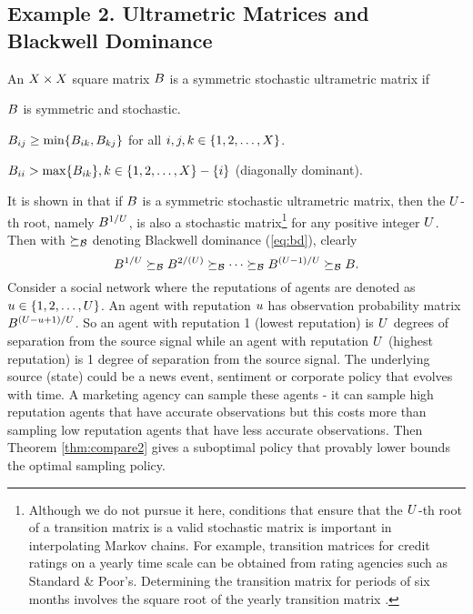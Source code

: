 \documentclass[draftcls,onecolumn]{IEEEtran}
\begin{document}
\subsection{Example 2.  Ultrametric Matrices  and Blackwell Dominance}
An $X\times X$ square matrix $B$ is   a symmetric stochastic ultrametric matrix if 
 
\begin{compactenum}
\item $B$ is symmetric and stochastic. 
\item $B_{ij} \geq \min \{B_{ik}, B_{kj}\}$ for all $i,j,k \in \{1,2,\ldots,X\}$.
\item $B_{ii} > \max \{B_{ik}\}, k \in  \{1,2,\ldots,X\}- \{i\}$  (diagonally dominant).
\end{compactenum}
 It is shown in \cite{HL11}  that if $B$ is a symmetric  stochastic  ultrametric matrix, then the $U$-th root, namely $B^{1/U}$, is also a stochastic matrix\footnote{Although we do not pursue it here, conditions that 
 ensure that  the $U$-th root of a transition matrix is a valid stochastic matrix  is important
 in interpolating Markov chains. For example, transition matrices for credit ratings on a yearly time scale
 can be obtained from rating agencies such as Standard \& Poor's. Determining the transition matrix for periods of six months involves the square root of the yearly transition matrix \cite{HL11}.}
for any positive  integer $U$. Then with $\succeq_{\mathcal{B}}$ denoting Blackwell dominance (\ref{eq:bd}),
clearly  $$B^{1/U} \succeq_{\mathcal{B}} B^{2/(U)} \succeq_{\mathcal{B}} \cdots \succeq_{\mathcal{B}} B^{(U-1)/U} \succeq_{\mathcal{B}} B . $$
Consider a  social network where
the reputations of agents are denoted as $u \in \{1,2,\ldots, U\}$. An agent with reputation $u$
has  observation probability matrix $B^{(U-u+1)/U}$.
So an agent with reputation 1 (lowest reputation) is $U$ degrees of separation from the source signal while an agent with reputation $U$ (highest reputation) is  
1 degree of separation from the source signal. 
The underlying source (state) could be a news event, sentiment or corporate policy that evolves
with time.  A marketing agency can sample these agents - it can sample high reputation agents that have accurate
observations but this costs more than sampling low reputation agents that have less accurate observations. 
Then Theorem \ref{thm:compare2}  gives a suboptimal policy that provably lower bounds the optimal sampling policy.
\end{document}
